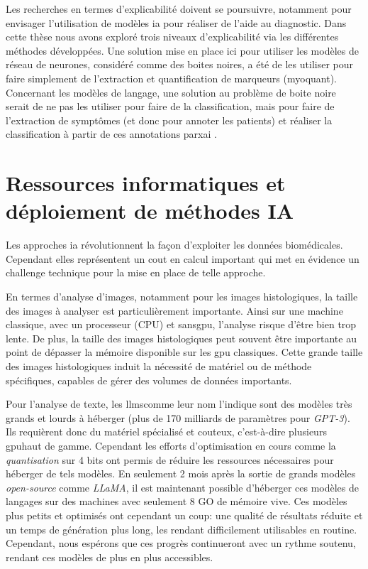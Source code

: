 Les recherches en termes d'explicabilité doivent se poursuivre, notamment pour envisager l'utilisation de modèles \gls{ia} pour réaliser de l'aide au diagnostic. Dans cette thèse nous avons exploré trois niveaux d'explicabilité via les différentes méthodes développées. Une solution mise en place ici pour utiliser les modèles de réseau de neurones, considéré comme des boites noires, a été de les utiliser pour faire simplement de l'extraction et quantification de marqueurs (\gls{myoquant}). Concernant les modèles de langage, une solution au problème de boite noire serait de ne pas les utiliser pour faire de la classification, mais pour faire de l'extraction de symptômes (et donc pour annoter les patients) et réaliser la classification à partir de ces annotations par\gls{xai} .

\section{Ressources informatiques et déploiement de méthodes IA}
Les approches \gls{ia} révolutionnent la façon d'exploiter les données biomédicales. Cependant elles représentent un cout en calcul important qui met en évidence un challenge technique pour la mise en place de telle approche.

En termes d'analyse d'images, notamment pour les images histologiques, la taille des images à analyser est particulièrement importante. Ainsi sur une machine classique, avec un processeur (CPU) et sans\gls{gpu}, l'analyse risque d'être bien trop lente.  De plus, la taille des images histologiques peut souvent être importante au point de dépasser la mémoire disponible sur les \gls{gpu} classiques. Cette grande taille des images histologiques induit la nécessité de matériel ou de méthode spécifiques, capables de gérer des volumes de données importants.

Pour l'analyse de texte, les  \gls{llms}comme leur nom l'indique sont des modèles très grands et lourds à héberger (plus de 170 milliards de paramètres pour \textit{GPT-3}). Ils requièrent donc du matériel spécialisé et couteux, c'est-à-dire plusieurs  \gls{gpu}haut de gamme. Cependant les efforts d'optimisation en cours comme la \textit{quantisation} sur 4 bits ont permis de réduire les ressources nécessaires pour héberger de tels modèles. En seulement 2 mois après la sortie de grands modèles \textit{open-source} comme \textit{LLaMA}, il est maintenant possible d'héberger ces modèles de langages sur des machines avec seulement 8 GO de mémoire vive. Ces modèles plus petits et optimisés ont cependant un coup: une qualité de résultats réduite et un temps de génération plus long, les rendant difficilement utilisables en routine. Cependant, nous espérons que ces progrès continueront avec un rythme soutenu, rendant ces modèles de plus en plus accessibles.

